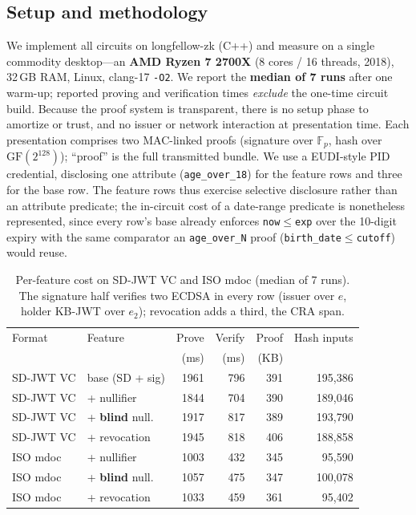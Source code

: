 \documentclass[11pt]{article}
\theoremstyle{plain}
\theoremstyle{definition}
\begin{document}
\subsection{Setup and methodology}
We implement all circuits on longfellow-zk (C++) and measure on a single commodity
desktop---an \textbf{AMD Ryzen 7 2700X} (8 cores / 16 threads, 2018), 32\,GB RAM,
Linux, clang-17 \texttt{-O2}. We report the \textbf{median of 7 runs} after one
warm-up; reported proving and verification times \emph{exclude} the one-time circuit
build. Because the proof system is transparent, there is no setup phase to amortize or
trust, and no issuer or network interaction at presentation time. Each presentation
comprises two MAC-linked proofs (signature over $\mathbb{F}_p$, hash over
$\mathrm{GF}(2^{128})$); ``proof'' is the full transmitted bundle. We use a EUDI-style
PID credential, disclosing one attribute (\texttt{age\_over\_18}) for the feature rows
and three for the base row. The feature rows thus exercise selective disclosure rather
than an attribute predicate; the in-circuit cost of a date-range predicate is nonetheless
represented, since every row's base already enforces \texttt{now}$\le$\texttt{exp} over the
10-digit expiry with the same comparator an \texttt{age\_over\_N} proof
(\texttt{birth\_date}$\le$\texttt{cutoff}) would reuse.

\begin{table}[t]\centering\small
\caption{Per-feature cost on SD-JWT VC and ISO mdoc (median of 7 runs). The signature
half verifies two ECDSA in every row (issuer over $e$, holder KB-JWT over $e_2$);
revocation adds a third, the CRA span.}
\label{tab:eval}
\begin{tabular}{@{}llrrrr@{}}
\toprule
Format & Feature & Prove & Verify & Proof & Hash inputs \\
       &         & (ms)  & (ms)   & (KB)  &             \\
\midrule
SD-JWT VC & base (SD + sig)        & 1961 & 796 & 391 & 195{,}386 \\
SD-JWT VC & + nullifier            & 1844 & 704 & 390 & 189{,}046 \\
SD-JWT VC & + \textbf{blind} null. & 1917 & 817 & 389 & 193{,}790 \\
SD-JWT VC & + revocation           & 1945 & 818 & 406 & 188{,}858 \\
ISO mdoc  & + nullifier            & 1003 & 432 & 345 & \phantom{0}95{,}590 \\
ISO mdoc  & + \textbf{blind} null. & 1057 & 475 & 347 & 100{,}078 \\
ISO mdoc  & + revocation           & 1033 & 459 & 361 & \phantom{0}95{,}402 \\
\bottomrule
\end{tabular}
\end{table}
\end{document}
